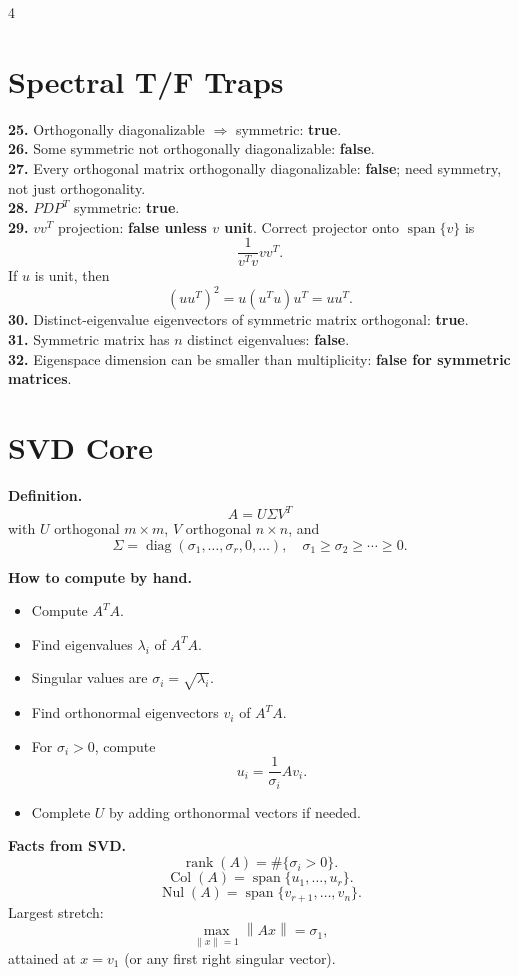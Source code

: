 \documentclass[letterpaper]{article}
\newcommand{\Span}{\operatorname{span}}
\newcommand{\Col}{\operatorname{Col}}
\newcommand{\Nul}{\operatorname{Nul}}
\newcommand{\Rank}{\operatorname{rank}}
\newcommand{\diag}{\operatorname{diag}}
\newcommand{\norm}[1]{\left\lVert #1\right\rVert}
\newcommand{\smallhead}[1]{{\bfseries #1}}
\begin{document}
\begin{multicols*}{4}
\section{Spectral T/F Traps}
\smallhead{25.} Orthogonally diagonalizable $\Rightarrow$ symmetric: \textbf{true}.\\
\smallhead{26.} Some symmetric not orthogonally diagonalizable: \textbf{false}.\\
\smallhead{27.} Every orthogonal matrix orthogonally diagonalizable: \textbf{false}; need symmetry, not just orthogonality.\\
\smallhead{28.} $PDP^T$ symmetric: \textbf{true}.\\
\smallhead{29.} $vv^T$ projection: \textbf{false unless $v$ unit}. Correct projector onto $\Span\{v\}$ is
\[
\frac{1}{v^Tv}vv^T.
\]
If $u$ is unit, then
\[
(uu^T)^2=u(u^Tu)u^T=uu^T.
\]
\smallhead{30.} Distinct-eigenvalue eigenvectors of symmetric matrix orthogonal: \textbf{true}.\\
\smallhead{31.} Symmetric matrix has $n$ distinct eigenvalues: \textbf{false}.\\
\smallhead{32.} Eigenspace dimension can be smaller than multiplicity: \textbf{false for symmetric matrices}.

\section{SVD Core}
\smallhead{Definition.}
\[
A=U\Sigma V^T
\]
with $U$ orthogonal $m\times m$, $V$ orthogonal $n\times n$, and
\[
\Sigma=\diag(\sigma_1,\dots,\sigma_r,0,\dots),\quad \sigma_1\ge \sigma_2\ge \cdots\ge 0.
\]

\smallhead{How to compute by hand.}
\begin{itemize}
\item Compute $A^TA$.
\item Find eigenvalues $\lambda_i$ of $A^TA$.
\item Singular values are $\sigma_i=\sqrt{\lambda_i}$.
\item Find orthonormal eigenvectors $v_i$ of $A^TA$.
\item For $\sigma_i>0$, compute
\[
u_i=\frac{1}{\sigma_i}Av_i.
\]
\item Complete $U$ by adding orthonormal vectors if needed.
\end{itemize}

\smallhead{Facts from SVD.}
\[
\Rank(A)=\#\{\sigma_i>0\}.
\]
\[
\Col(A)=\Span\{u_1,\dots,u_r\}.
\]
\[
\Nul(A)=\Span\{v_{r+1},\dots,v_n\}.
\]
Largest stretch:
\[
\max_{\norm{x}=1}\norm{Ax}=\sigma_1,
\]
attained at $x=v_1$ (or any first right singular vector).


\end{multicols*}
\end{document}
